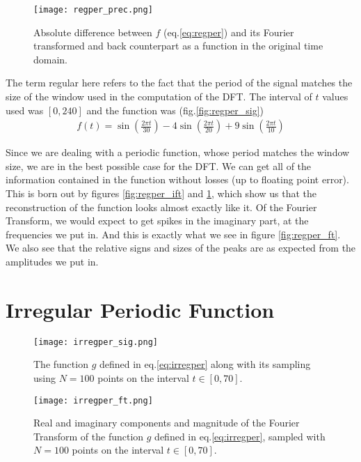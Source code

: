\documentclass[10pt,a4paper,twocolumn]{article}
\begin{document}
\begin{figure}
\centering
\captionsetup{justification=centering}
\texttt{[image: regper\_prec.png]}
\caption{Absolute difference between $f$ (eq.\ref{eq:regper}) and its Fourier transformed and back counterpart as a function in the original time domain.}
\label{fig:regper_prec}
\end{figure}

The term regular here refers to the fact that the period of the signal matches the size of the window used in the computation of the DFT. The interval of $t$ values used was $[0, 240]$ and the function was (fig.\ref{fig:regper_sig})
%
\begin{align}\label{eq:regper}
f(t) = \sin \left( \frac{2 \pi t}{30} \right) - 4 \sin \left( \frac{2 \pi t}{20} \right) + 9 \sin \left( \frac{2 \pi t}{10} \right)
\end{align}

Since we are dealing with a periodic function, whose period matches the window size, we are in the best possible case for the DFT. We can get all of the information contained in the function without losses (up to floating point error). This is born out by figures \ref{fig:regper_ift} and \ref{fig:regper_prec}, which show us that the reconstruction of the function looks almost exactly like it. Of the Fourier Transform, we would expect to get spikes in the imaginary part, at the frequencies we put in. And this is exactly what we see in figure \ref{fig:regper_ft}. We also see that the relative signs and sizes of the peaks are as expected from the amplitudes we put in.


\section{Irregular Periodic Function}

\begin{figure}
\centering
\captionsetup{justification=centering}
\texttt{[image: irregper\_sig.png]}
\caption{The function $g$ defined in eq.\ref{eq:irregper} along with its sampling using $N=100$ points on the interval $t \in [0, 70]$.}
\label{fig:irregper_sig}
\end{figure}

\begin{figure}
\centering
\captionsetup{justification=centering}
\texttt{[image: irregper\_ft.png]}
\caption{Real and imaginary components and magnitude of the Fourier Transform of the function $g$ defined in eq.\ref{eq:irregper}, sampled with $N=100$ points on the interval $t \in [0,70]$.}
\label{fig:irregper_ft}
\end{figure}
\end{document}
